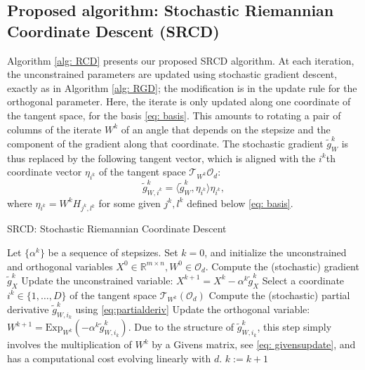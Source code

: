 \documentclass{article}
\def \R {\mathbb{R}}
\def \O {\mathcal{O}}
\def \Exp {\mathrm{Exp}}
\begin{document}
\subsection{Proposed algorithm: Stochastic Riemannian Coordinate Descent (SRCD)}
Algorithm \ref{alg: RCD} presents our proposed SRCD algorithm. At each iteration, the unconstrained parameters are updated using stochastic gradient descent, exactly as in Algorithm \ref{alg: RGD}; the modification is in the update rule for the orthogonal parameter. Here, the iterate is only updated along one coordinate of the tangent space, for the basis \eqref{eq: basis}. This amounts to rotating a pair of columns of the iterate $W^k$ of an angle that depends on the stepsize and the component of the gradient along that coordinate. The stochastic gradient $\tilde{g}_W^k$ is thus replaced by the following tangent vector, which is aligned with the $i^k$th coordinate vector $\eta_{i^k}$ of the tangent space $\mathcal{T}_{W^k} \O_d$: 
\begin{equation} \label{eq: tildegcoord}
    \tilde g_{W,i^k}^k = \langle \tilde{g}_W^k, \eta_{i^k} \rangle \eta_{i^k},
\end{equation} 
where $\eta_{i^k} = W^k H_{j^k,l^k}$ for some given $j^k,l^k$ defined below \eqref{eq: basis}. 

\begin{algorithm}[t]
	\caption{SRCD: Stochastic Riemannian Coordinate Descent}
	\label{alg: RCD}
	\begin{algorithmic}[1]
		\State Let $\{\alpha^k\}$ be a sequence of stepsizes. Set $k = 0$, and initialize the unconstrained and orthogonal variables $X^0 \in \R^{m \times n}, W^0 \in \mathcal{O}_{d}$. 
		\State Compute the (stochastic) gradient $\tilde{g}_X^k$
		\State Update the unconstrained variable: $X^{k+1} = X^k - \alpha^k \tilde{g}_X^k$
		\State Select a coordinate $i^k \in \{1, \dots, D\}$ of the tangent space $\mathcal{T}_{W^k}(\O_d) $
		\State Compute the (stochastic) partial derivative $\tilde{g}_{W, i_k}^k$ using \eqref{eq:partialderiv} \label{algline:partialderiv}
		\State Update the orthogonal variable: $W^{k+1} =  \Exp_{W^k}( - \alpha^k \tilde{g}_{W, i_k}^k)$. Due to the structure of $\tilde{g}_{W, i_k}^k$, this step simply involves the multiplication of $W^{k}$ by a Givens matrix, see \eqref{eq: givensupdate}, and has a computational cost evolving linearly with $d$. \label{line:coordinateStep}
		\State $k := k+1$
		\EndWhile
	\end{algorithmic}
\end{algorithm}
\end{document}
